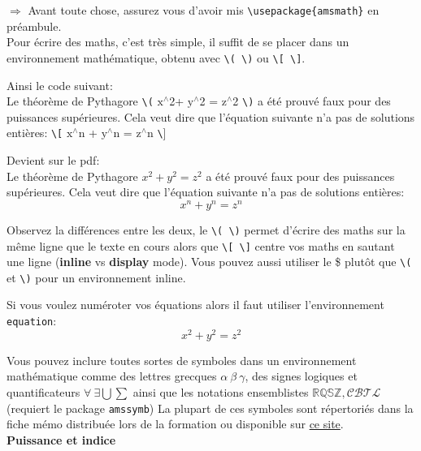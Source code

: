 \documentclass[11pt]{article}				%
\newcommand{\tb}{\textbackslash}
\newcommand{\cmd}[2]{\texttt{\textbackslash #1}\texttt{\{#2\}}}
\begin{document}
$\Rightarrow$ Avant toute chose, assurez vous d'avoir mis \cmd{usepackage}{amsmath} en préambule.\\

Pour écrire des maths, c'est très simple, il suffit de se placer dans un environnement mathématique, obtenu avec \texttt{\tb( \tb)} ou \texttt{\tb[ \tb]}. 

\begin{multicols}{2}
Ainsi le code suivant:\\
\textsf{Le théorème de Pythagore \texttt{\tb(} $\text{x}^{\wedge}$2+ $\text{y}^{\wedge}$2 = $\text{z}^{\wedge}$2 \texttt{\tb)} a été prouvé faux pour des puissances supérieures. Cela veut dire que l'équation suivante n'a pas de solutions entières:
	 \texttt{\tb[} $\text{x}^{\wedge}$n + $\text{y}^{\wedge}$n = $\text{z}^{\wedge}$n \texttt{\tb}] }
	
	\columnbreak
	
	Devient sur le pdf:\\	
	Le théorème de Pythagore $x^2 + y^2 = z^2$ a été prouvé faux pour des puissances supérieures. Cela veut dire que l'équation suivante n'a pas de solutions entières: \[ x^n + y^n = z^n \]
	
	
	
\end{multicols}

Observez la différences entre les deux, le \texttt{\tb( \tb)} permet d'écrire des maths sur la même ligne que le texte en cours alors que \texttt{\tb[ \tb]} centre vos maths en sautant une ligne (\textbf{inline} vs \textbf{display} mode). Vous pouvez aussi utiliser le \$ plutôt que \texttt{\tb(} et \texttt{\tb)} pour un environnement inline.

Si vous voulez numéroter vos équations alors il faut utiliser l'environnement \texttt{equation}:
\begin{equation}
x^2 +y^2 = z^2
\end{equation}

Vous pouvez inclure toutes sortes de symboles dans un environnement mathématique comme des lettres grecques $\alpha \ \beta \ \gamma$, des signes logiques et quantificateurs $\forall \ \exists \bigcup \sum$ ainsi que les notations ensemblistes $\mathbb{RQSZ}, \mathcal{CBTL}$ (requiert le package \verb|amssymb|) La plupart de ces symboles sont répertoriés dans la fiche mémo distribuée lors de la formation ou disponible sur \href{http://latex.enpc.org}{ce site}.\\

\textbf{Puissance et indice}\\
\end{document}
